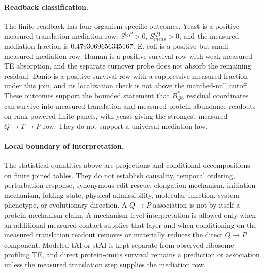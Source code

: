 \paragraph{Readback classification.}
The finite readback has four organism-specific outcomes.  Yeast is a positive measured-translation mediation row: $S^{QP}>0$, $S^{QT}_{meas}>0$, and the measured mediation fraction is $0.4793069656345167$.  E. coli is a positive but small measured-mediation row.  Human is a positive-survival row with weak measured-TE absorption, and the separate turnover probe does not absorb the remaining residual.  Danio is a positive-survival row with a suppressive measured fraction under this join, and its localization check is not above the matched-null cutoff.  These outcomes support the bounded statement that $B^{\ast}_{Q6}$ residual coordinates can survive into measured translation and measured protein-abundance readouts on rank-powered finite panels, with yeast giving the strongest measured $Q \to T \to P$ row.  They do not support a universal mediation law.

\paragraph{Local boundary of interpretation.}
The statistical quantities above are projections and conditional decompositions on finite joined tables.  They do not establish causality, temporal ordering, perturbation response, synonymous-edit rescue, elongation mechanism, initiation mechanism, folding state, physical admissibility, molecular function, system phenotype, or evolutionary direction.  A $Q \to P$ association is not by itself a protein mechanism claim.  A mechanism-level interpretation is allowed only when an additional measured contact supplies that layer and when conditioning on the measured translation readout removes or materially reduces the direct $Q \to P$ component.  Modeled tAI or stAI is kept separate from observed ribosome-profiling TE, and direct protein-omics survival remains a prediction or association unless the measured translation step supplies the mediation row.
